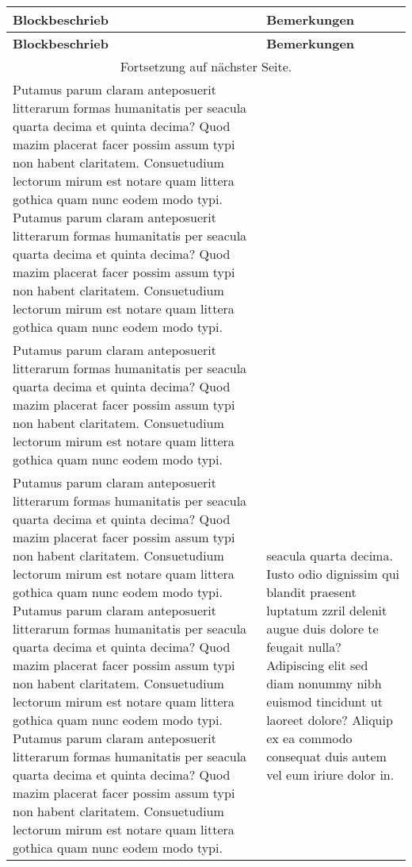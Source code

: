 \documentclass[12pt]{article}
\begin{document}
\begin{longtable}{|p{12cm}|p{5cm+2\arrayrulewidth}|}
	\hline 
	\bf Blockbeschrieb & \bf Bemerkungen \\ \hline 
	\endfirsthead \hline \bf Blockbeschrieb & \bf Bemerkungen \\ \hline 
	\endhead \hline 
	\multicolumn{2}{|c|}{Fortsetzung auf nächster Seite.} \\ \hline 
	\endfoot
	\endlastfoot 
	Putamus parum claram anteposuerit litterarum formas humanitatis per seacula quarta decima et quinta decima? Quod mazim placerat facer possim assum typi non habent claritatem. Consuetudium lectorum mirum est notare quam littera gothica quam nunc eodem modo typi.
Putamus parum claram anteposuerit litterarum formas humanitatis per seacula quarta decima et quinta decima? Quod mazim placerat facer possim assum typi non habent claritatem. Consuetudium lectorum mirum est notare quam littera gothica quam nunc eodem modo typi. & \\
Putamus parum claram anteposuerit litterarum formas humanitatis per seacula quarta decima et quinta decima? Quod mazim placerat facer possim assum typi non habent claritatem. Consuetudium lectorum mirum est notare quam littera gothica quam nunc eodem modo typi. &
\\
Putamus parum claram anteposuerit litterarum formas humanitatis per seacula quarta decima et quinta decima? Quod mazim placerat facer possim assum typi non habent claritatem. Consuetudium lectorum mirum est notare quam littera gothica quam nunc eodem modo typi.
Putamus parum claram anteposuerit litterarum formas humanitatis per seacula quarta decima et quinta decima? Quod mazim placerat facer possim assum typi non habent claritatem. Consuetudium lectorum mirum est notare quam littera gothica quam nunc eodem modo typi.
Putamus parum claram anteposuerit litterarum formas humanitatis per seacula quarta decima et quinta decima? Quod mazim placerat facer possim assum typi non habent claritatem. Consuetudium lectorum mirum est notare quam littera gothica quam nunc eodem modo typi.
 & seacula quarta decima. Iusto odio dignissim qui blandit praesent luptatum zzril delenit augue duis dolore te feugait nulla? Adipiscing elit sed diam nonummy nibh euismod tincidunt ut laoreet dolore? Aliquip ex ea commodo consequat duis autem vel eum iriure dolor in. \\ \hline

	\end{longtable}
\end{document}
